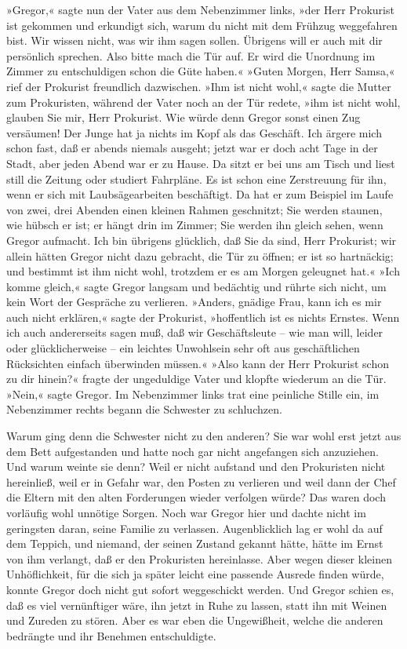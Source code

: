 »Gregor,« sagte nun der Vater aus dem Nebenzimmer links, »der Herr
Prokurist ist gekommen und erkundigt sich, warum du nicht mit dem
Frühzug weggefahren bist. Wir wissen nicht, was wir ihm sagen sollen.
Übrigens will er auch mit dir persönlich sprechen. Also bitte mach die
Tür auf. Er wird die Unordnung im Zimmer zu entschuldigen schon die Güte
haben.« »Guten Morgen, Herr Samsa,« rief der Prokurist freundlich
dazwischen. »Ihm ist nicht wohl,« sagte die Mutter zum Prokuristen,
während der Vater noch an der Tür redete, »ihm ist nicht wohl, glauben
Sie mir, Herr Prokurist. Wie würde denn Gregor sonst einen Zug
versäumen! Der Junge hat ja nichts im Kopf als das Geschäft. Ich ärgere
mich schon fast, daß er abends niemals ausgeht; jetzt war er doch acht
Tage in der Stadt, aber jeden Abend war er zu Hause. Da sitzt er bei uns
am Tisch und liest still die Zeitung oder studiert Fahrpläne. Es ist
schon eine Zerstreuung für ihn, wenn er sich mit Laubsägearbeiten
beschäftigt. Da hat er zum Beispiel im Laufe von zwei, drei Abenden
einen kleinen Rahmen geschnitzt; Sie werden staunen, wie hübsch er ist;
er hängt drin im Zimmer; Sie werden ihn gleich sehen, wenn Gregor
aufmacht. Ich bin übrigens glücklich, daß Sie da sind, Herr Prokurist;
wir allein hätten Gregor nicht dazu gebracht, die Tür zu öffnen; er ist
so hartnäckig; und bestimmt ist ihm nicht wohl, trotzdem er es am Morgen
geleugnet hat.« »Ich komme gleich,« sagte Gregor langsam und bedächtig
und rührte sich nicht, um kein Wort der Gespräche zu verlieren. »Anders,
gnädige Frau, kann ich es mir auch nicht erklären,« sagte der Prokurist,
»hoffentlich ist es nichts Ernstes. Wenn ich auch andererseits sagen
muß, daß wir Geschäftsleute -- wie man will, leider oder
glücklicherweise -- ein leichtes Unwohlsein sehr oft aus geschäftlichen
Rücksichten einfach überwinden müssen.« »Also kann der Herr Prokurist
schon zu dir hinein?« fragte der ungeduldige Vater und klopfte wiederum
an die Tür. »Nein,« sagte Gregor. Im Nebenzimmer links trat eine
peinliche Stille ein, im Nebenzimmer rechts begann die Schwester zu
schluchzen.

Warum ging denn die Schwester nicht zu den anderen? Sie war wohl erst
jetzt aus dem Bett aufgestanden und hatte noch gar nicht angefangen sich
anzuziehen. Und warum weinte sie denn? Weil er nicht aufstand und den
Prokuristen nicht hereinließ, weil er in Gefahr war, den Posten zu
verlieren und weil dann der Chef die Eltern mit den alten Forderungen
wieder verfolgen würde? Das waren doch vorläufig wohl unnötige Sorgen.
Noch war Gregor hier und dachte nicht im geringsten daran, seine Familie
zu verlassen. Augenblicklich lag er wohl da auf dem Teppich, und
niemand, der seinen Zustand gekannt hätte, hätte im Ernst von ihm
verlangt, daß er den Prokuristen hereinlasse. Aber wegen dieser kleinen
Unhöflichkeit, für die sich ja später leicht eine passende Ausrede
finden würde, konnte Gregor doch nicht gut sofort weggeschickt werden.
Und Gregor schien es, daß es viel vernünftiger wäre, ihn jetzt in Ruhe
zu lassen, statt ihn mit Weinen und Zureden zu stören. Aber es war eben
die Ungewißheit, welche die anderen bedrängte und ihr Benehmen
entschuldigte.

